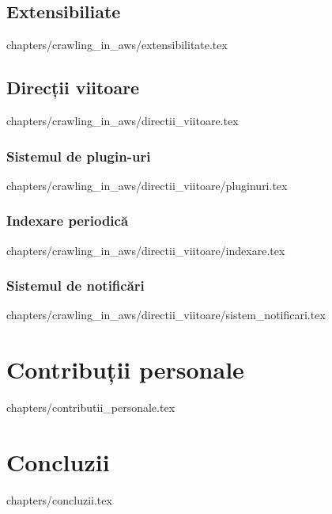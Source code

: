 \documentclass[12pt,oneside]{report}
\newcommand{\chaptertitle}[1]{\LARGE{#1}}
\begin{document}
\section{Extensibiliate}
 {
	chapters/crawling_in_aws/extensibilitate.tex
}

\section{Direcții viitoare}
 {
	chapters/crawling_in_aws/directii_viitoare.tex
}

\subsection{Sistemul de plugin-uri}
 {
	chapters/crawling_in_aws/directii_viitoare/pluginuri.tex
}

\subsection{Indexare periodică}
 {
	chapters/crawling_in_aws/directii_viitoare/indexare.tex
}

\subsection{Sistemul de notificări}
 {
	chapters/crawling_in_aws/directii_viitoare/sistem_notificari.tex
}
\clearpage

\setcounter{section}{0}
\chapter*{\chaptertitle{Contribuții personale}}
 {
	chapters/contributii_personale.tex
}

\setcounter{section}{0}
\chapter*{\chaptertitle{Concluzii}}
 {
	chapters/concluzii.tex
}


\clearpage


\end{document}
